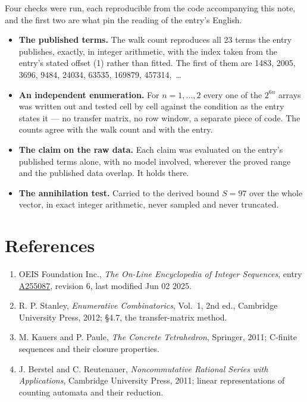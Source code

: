\documentclass[11pt]{article}
\theoremstyle{definition}
\begin{document}
Four checks were run, each reproducible from the code accompanying this note, and the first two are what pin the reading of the entry's English.

\begin{itemize}

\item {\bfseries The published terms.} The walk count reproduces all 23 terms the entry publishes, exactly, in integer arithmetic, with the index taken from the entry's stated offset (1) rather than fitted. The first of them are 1483, 2005, 3696, 9484, 24034, 63535, 169879, 457314,~\dots

\item {\bfseries An independent enumeration.} For $n = 1,\dots,2$ every one of the $2^{6n}$ arrays was written out and tested cell by cell against the condition as the entry states it --- no transfer matrix, no row window, a separate piece of code. The counts agree with the walk count and with the entry.

\item {\bfseries The claim on the raw data.} Each claim was evaluated on the entry's published terms alone, with no model involved, wherever the proved range and the published data overlap. It holds there.

\item {\bfseries The annihilation test.} Carried to the derived bound $S = 97$ over the whole vector, in exact integer arithmetic, never sampled and never truncated.

\end{itemize}

\section{References}

\begin{enumerate}

\item OEIS Foundation Inc., \emph{The On-Line Encyclopedia of Integer Sequences}, entry \href{https://oeis.org/A255087}{A255087}, revision 6, last modified Jun 02 2025.

\item R. P. Stanley, \emph{Enumerative Combinatorics}, Vol.~1, 2nd ed., Cambridge University Press, 2012; \S4.7, the transfer-matrix method.

\item M. Kauers and P. Paule, \emph{The Concrete Tetrahedron}, Springer, 2011; C-finite sequences and their closure properties.

\item J. Berstel and C. Reutenauer, \emph{Noncommutative Rational Series with Applications}, Cambridge University Press, 2011; linear representations of counting automata and their reduction.

\end{enumerate}
\end{document}
